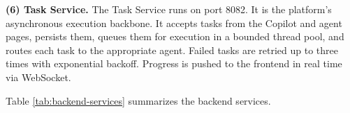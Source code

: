 \textbf{(6) Task Service.} The Task Service runs on port 8082. It is the platform's asynchronous execution backbone. It accepts tasks from the Copilot and agent pages, persists them, queues them for execution in a bounded thread pool, and routes each task to the appropriate agent. Failed tasks are retried up to three times with exponential backoff. Progress is pushed to the frontend in real time via WebSocket.

Table \ref{tab:backend-services} summarizes the backend services.

\vspace{3mm}

\begin{table}[H]
\small\singlespacing
\centering
\caption{Backend Service Ecosystem and Technical Orchestration}
\label{tab:backend-services}
\vspace{2mm}


\end{table}

